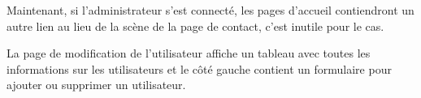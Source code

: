 \documentclass{article}
\begin{document}
\begin{enumerate}
  \vspace{0.7cm}
               \hspace*{-0.7in}
               \noindent{}
  
  
  
Maintenant, si l'administrateur s'est connecté, les pages d'accueil contiendront un autre lien au lieu de la scène de la page de contact, c'est inutile pour le cas.
  
  
  
  \vspace{0.7cm}
               \hspace*{-0.7in}
               \noindent{}
  
  
  La page de modification de l'utilisateur affiche un tableau avec toutes les informations sur les utilisateurs et le côté gauche contient un formulaire pour ajouter ou supprimer un utilisateur.
  

\end{enumerate}
\end{document}
